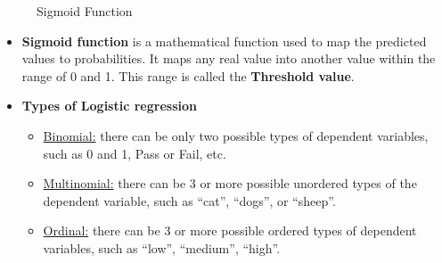\documentclass[
  letterpaper,
  DIV=11,
  numbers=noendperiod]{scrartcl}
\begin{document}
\begin{itemize}
\begin{itemize}
\begin{figure}
{    }

    \caption{Sigmoid Function}

    \end{figure}
  \end{itemize}
\end{itemize}

\hfill\break

\begin{itemize}
\item
  {\textbf{Sigmoid function}} is a mathematical function used to map the
  predicted values to probabilities. It maps any real value into another
  value within the range of 0 and 1. This range is called the
  \textbf{Threshold value}.
\item
  \textbf{Types of Logistic regression}

  \begin{itemize}
  \item
    \ul{Binomial:} there can be only two possible types of dependent
    variables, such as 0 and 1, Pass or Fail, etc.
  \item
    \ul{Multinomial:} there can be 3 or more possible unordered types of
    the dependent variable, such as ``cat'', ``dogs'', or ``sheep''.
  \item
    \ul{Ordinal:} there can be 3 or more possible ordered types of
    dependent variables, such as ``low'', ``medium'', ``high''.
  \end{itemize}
\end{itemize}
\end{document}
